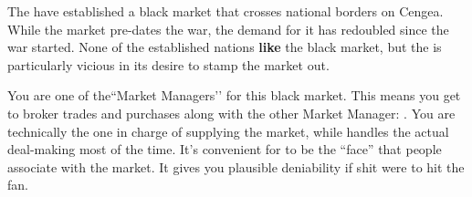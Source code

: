 \documentclass[green]{GL2020}
\begin{document}
\name{\gBMSupply{}}

The \pGoaties{} have established a black market that crosses national borders on Cengea. While the market pre-dates the war, the demand for it has redoubled since the war started. None of the established nations \textbf{like} the black market, but the \pTech{} is particularly vicious in its desire to stamp the market out.

You are one of the``Market Managers’’ for this black market. This means you get to broker trades and purchases along with the other Market Manager: \cChupSecond{\full}. You are technically the one in charge of supplying the market, while \cChupSecond{} handles the actual deal-making most of the time. It’s convenient for \cChupSecond{} to be the ``face'' that people associate with the market. It gives you plausible deniability if shit were to hit the fan.
\end{document}
